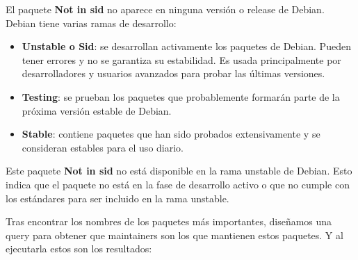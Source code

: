 \documentclass[a4paper, 12pt]{book}
\begin{document}
El paquete \textbf{Not in sid} no aparece en ninguna versión o release de Debian.
Debian tiene varias ramas de desarrollo:
\begin{itemize}
	\item \textbf{Unstable o Sid}: se desarrollan activamente los paquetes de Debian. Pueden tener errores y no se garantiza su estabilidad. Es usada principalmente por desarrolladores y usuarios avanzados para probar las últimas versiones.
	\item \textbf{Testing}: se prueban los paquetes que probablemente formarán parte de la próxima versión estable de Debian.
	\item \textbf{Stable}: contiene paquetes que han sido probados extensivamente y se consideran estables para el uso diario.
	
\end{itemize}

Este paquete \textbf{Not in sid} no está disponible en la rama unstable de Debian. Esto indica que el paquete no está en la fase de desarrollo activo o que no cumple con los estándares para ser incluido en la rama unstable.

Tras encontrar los nombres de los paquetes más importantes, diseñamos una query para obtener que maintainers son los que mantienen estos paquetes. Y al ejecutarla estos son los resultados:
\end{document}
